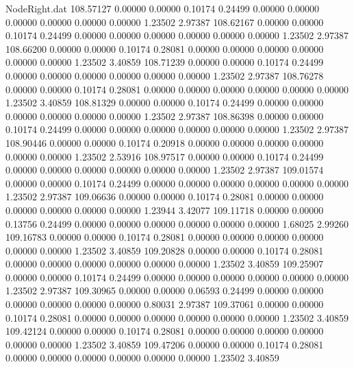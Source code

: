 \begin{filecontents}{NodeRight.dat}
 108.57127    0.00000    0.00000     0.10174    0.24499    0.00000    0.00000    0.00000    0.00000    0.00000    0.00000    1.23502    2.97387
 108.62167    0.00000    0.00000     0.10174    0.24499    0.00000    0.00000    0.00000    0.00000    0.00000    0.00000    1.23502    2.97387
 108.66200    0.00000    0.00000     0.10174    0.28081    0.00000    0.00000    0.00000    0.00000    0.00000    0.00000    1.23502    3.40859
 108.71239    0.00000    0.00000     0.10174    0.24499    0.00000    0.00000    0.00000    0.00000    0.00000    0.00000    1.23502    2.97387
 108.76278    0.00000    0.00000     0.10174    0.28081    0.00000    0.00000    0.00000    0.00000    0.00000    0.00000    1.23502    3.40859
 108.81329    0.00000    0.00000     0.10174    0.24499    0.00000    0.00000    0.00000    0.00000    0.00000    0.00000    1.23502    2.97387
 108.86398    0.00000    0.00000     0.10174    0.24499    0.00000    0.00000    0.00000    0.00000    0.00000    0.00000    1.23502    2.97387
 108.90446    0.00000    0.00000     0.10174    0.20918    0.00000    0.00000    0.00000    0.00000    0.00000    0.00000    1.23502    2.53916
 108.97517    0.00000    0.00000     0.10174    0.24499    0.00000    0.00000    0.00000    0.00000    0.00000    0.00000    1.23502    2.97387
 109.01574    0.00000    0.00000     0.10174    0.24499    0.00000    0.00000    0.00000    0.00000    0.00000    0.00000    1.23502    2.97387
 109.06636    0.00000    0.00000     0.10174    0.28081    0.00000    0.00000    0.00000    0.00000    0.00000    0.00000    1.23944    3.42077
 109.11718    0.00000    0.00000     0.13756    0.24499    0.00000    0.00000    0.00000    0.00000    0.00000    0.00000    1.68025    2.99260
 109.16783    0.00000    0.00000     0.10174    0.28081    0.00000    0.00000    0.00000    0.00000    0.00000    0.00000    1.23502    3.40859
 109.20828    0.00000    0.00000     0.10174    0.28081    0.00000    0.00000    0.00000    0.00000    0.00000    0.00000    1.23502    3.40859
 109.25907    0.00000    0.00000     0.10174    0.24499    0.00000    0.00000    0.00000    0.00000    0.00000    0.00000    1.23502    2.97387
 109.30965    0.00000    0.00000     0.06593    0.24499    0.00000    0.00000    0.00000    0.00000    0.00000    0.00000    0.80031    2.97387
 109.37061    0.00000    0.00000     0.10174    0.28081    0.00000    0.00000    0.00000    0.00000    0.00000    0.00000    1.23502    3.40859
 109.42124    0.00000    0.00000     0.10174    0.28081    0.00000    0.00000    0.00000    0.00000    0.00000    0.00000    1.23502    3.40859
 109.47206    0.00000    0.00000     0.10174    0.28081    0.00000    0.00000    0.00000    0.00000    0.00000    0.00000    1.23502    3.40859

\end{filecontents}
